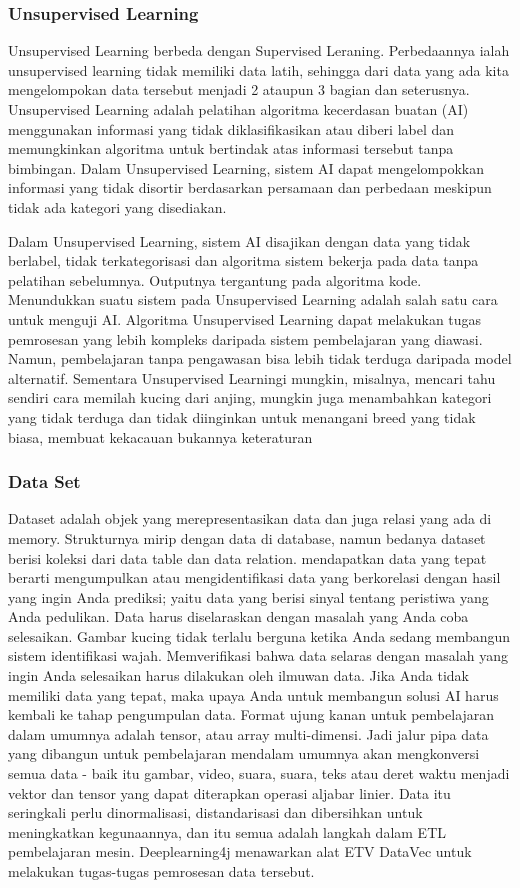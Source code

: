 \subsubsection{Unsupervised Learning}
Unsupervised Learning berbeda dengan Supervised Leraning. Perbedaannya ialah unsupervised learning tidak memiliki data latih, sehingga dari data yang ada kita mengelompokan data tersebut menjadi 2 ataupun 3 bagian dan seterusnya. Unsupervised Learning adalah pelatihan algoritma kecerdasan buatan (AI) menggunakan informasi yang tidak diklasifikasikan atau diberi label dan memungkinkan algoritma untuk bertindak atas informasi tersebut tanpa bimbingan. Dalam Unsupervised Learning, sistem AI dapat mengelompokkan informasi yang tidak disortir berdasarkan persamaan dan perbedaan meskipun tidak ada kategori yang disediakan.

Dalam Unsupervised Learning, sistem AI disajikan dengan data yang tidak berlabel, tidak terkategorisasi dan algoritma sistem bekerja pada data tanpa pelatihan sebelumnya. Outputnya tergantung pada algoritma kode. Menundukkan suatu sistem pada Unsupervised Learning adalah salah satu cara untuk menguji AI. Algoritma Unsupervised Learning dapat melakukan tugas pemrosesan yang lebih kompleks daripada sistem pembelajaran yang
diawasi. Namun, pembelajaran tanpa pengawasan bisa lebih tidak terduga daripada model alternatif. Sementara Unsupervised Learningi mungkin, misalnya, mencari tahu sendiri cara memilah kucing dari anjing, mungkin juga menambahkan kategori yang tidak terduga dan tidak diinginkan untuk menangani breed yang tidak biasa, membuat kekacauan bukannya keteraturan


\subsubsection{Data Set}
Dataset adalah objek yang merepresentasikan data dan juga relasi yang ada di memory. Strukturnya mirip dengan data di database, namun bedanya
dataset berisi koleksi dari data table dan data relation. mendapatkan data yang tepat berarti mengumpulkan atau mengidentifikasi data yang berkorelasi dengan hasil yang ingin Anda prediksi; yaitu data yang berisi sinyal tentang peristiwa yang Anda pedulikan. Data harus diselaraskan dengan masalah yang Anda coba selesaikan. Gambar kucing tidak terlalu berguna ketika Anda sedang membangun sistem identifikasi wajah. Memverifikasi bahwa data selaras dengan masalah yang ingin Anda selesaikan harus dilakukan oleh ilmuwan data. Jika Anda tidak memiliki data yang tepat, maka upaya Anda untuk membangun solusi AI harus kembali ke tahap pengumpulan data. Format ujung kanan untuk pembelajaran dalam umumnya adalah tensor, atau array multi-dimensi. Jadi jalur pipa data yang dibangun untuk pembelajaran mendalam umumnya akan mengkonversi semua data - baik itu gambar, video, suara, suara, teks atau deret waktu  menjadi vektor dan tensor yang dapat diterapkan operasi aljabar linier. Data itu seringkali perlu dinormalisasi, distandarisasi dan dibersihkan untuk meningkatkan kegunaannya, dan itu semua adalah langkah dalam ETL pembelajaran mesin. Deeplearning4j menawarkan alat ETV DataVec untuk melakukan tugas-tugas pemrosesan data tersebut.

